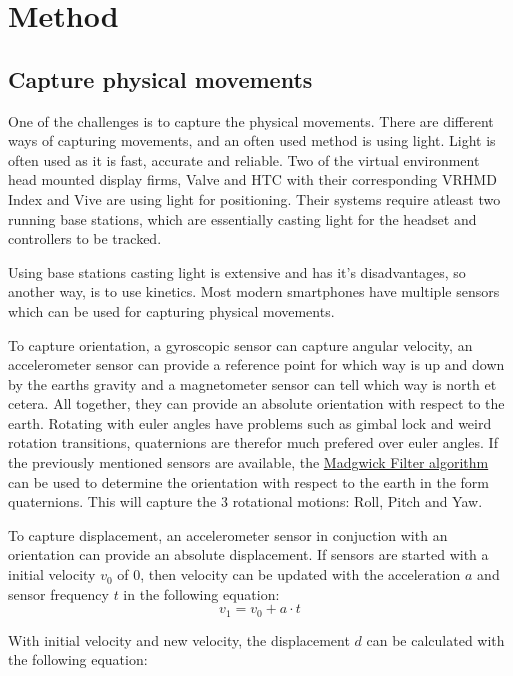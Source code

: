 \section{Method}

\subsection{Capture physical movements}
One of the challenges is to capture the physical movements.
There are different ways of capturing movements, and an often used method is using light.
Light is often used as it is fast, accurate and reliable. Two of the virtual environment head mounted display firms, 
Valve and HTC with their corresponding VRHMD Index and Vive are using light for positioning. 
Their systems require atleast two running base stations, which are essentially casting light for the headset and controllers to be tracked.


Using base stations casting light is extensive and has it's disadvantages, so another way, is to use kinetics.
Most modern smartphones have multiple sensors which can be used for capturing physical movements.

To capture orientation, a gyroscopic sensor can capture angular velocity, 
an accelerometer sensor can provide a reference point for which way is up and down by the earths gravity
and a magnetometer sensor can tell which way is north et cetera. 
All together, they can provide an absolute orientation with respect to the earth. 
Rotating with euler angles have problems such as gimbal lock and weird rotation transitions, quaternions are therefor much prefered over euler angles.
If the previously mentioned sensors are available, the \href{https://nitinjsanket.github.io/tutorials/attitudeest/madgwick#madgwickfilt}{Madgwick Filter algorithm} can be used to determine the orientation with respect to the earth in the form quaternions.
This will capture the 3 rotational motions: Roll, Pitch and Yaw.

To capture displacement, an accelerometer sensor in conjuction with an orientation can provide an absolute displacement.
If sensors are started with a initial velocity $v_0$ of 0, then velocity can be updated with the acceleration $a$ and sensor frequency $t$ in the following equation:
\begin{equation}
    v_1 = v_0 + a \cdot t
\end{equation}

With initial velocity and new velocity, the displacement $d$ can be calculated with the following equation:

